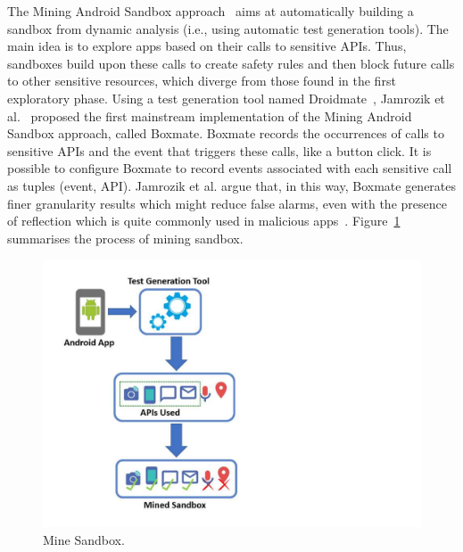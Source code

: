 


The Mining Android Sandbox approach~\cite{DBLP:conf/icse/JamrozikSZ16} aims at automatically
building a sandbox from dynamic analysis (i.e., using automatic test generation tools).
The main idea is to explore apps based on their calls to sensitive APIs.
Thus, sandboxes build upon these calls to create safety rules and then block future
calls to other sensitive resources, which diverge from those found in the first exploratory
phase. Using a test generation tool named Droidmate~\cite{DBLP:conf/icse/JamrozikZ16},
Jamrozik et al.~\cite{DBLP:conf/icse/JamrozikSZ16} proposed the first mainstream
implementation of the Mining Android Sandbox approach, called Boxmate. 
Boxmate records the occurrences of calls to sensitive APIs and the event that triggers these calls,
like a button click. It is possible to configure Boxmate to record events associated with each sensitive call as
tuples (event, API). Jamrozik et al. argue that, in this way, Boxmate generates finer granularity results which
might reduce false alarms, even with the presence of reflection which is quite commonly used in
malicious apps~\cite{DBLP:conf/issta/0029BOK16}. Figure~\ref{fig:mineSandbox}  summarises the process of mining sandbox. 

\begin{figure}[ht]
\centering
\includegraphics[scale=0.35]{images/mineSandbox_.pdf}
\caption{Mine Sandbox.}
 \label{fig:mineSandbox}
\end{figure}

